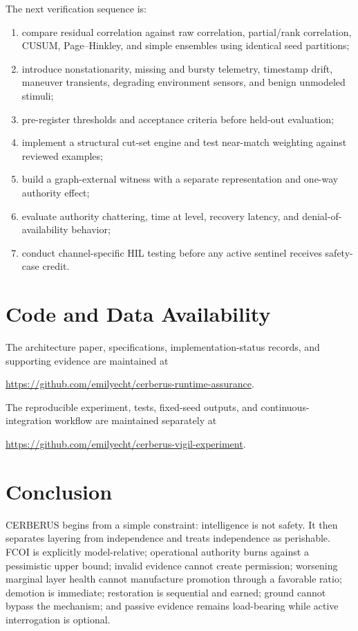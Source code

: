 The next verification sequence is:
\begin{enumerate}[leftmargin=1.5em]
  \item compare residual correlation against raw correlation, partial/rank correlation, CUSUM, Page--Hinkley, and simple ensembles using identical seed partitions;
  \item introduce nonstationarity, missing and bursty telemetry, timestamp drift, maneuver transients, degrading environment sensors, and benign unmodeled stimuli;
  \item pre-register thresholds and acceptance criteria before held-out evaluation;
  \item implement a structural cut-set engine and test near-match weighting against reviewed examples;
  \item build a graph-external witness with a separate representation and one-way authority effect;
  \item evaluate authority chattering, time at level, recovery latency, and denial-of-availability behavior;
  \item conduct channel-specific HIL testing before any active sentinel receives safety-case credit.
\end{enumerate}

\section{Code and Data Availability}
The architecture paper, specifications, implementation-status records, and supporting evidence are maintained at
\begin{center}
\url{https://github.com/emilyecht/cerberus-runtime-assurance}.
\end{center}
The reproducible experiment, tests, fixed-seed outputs, and continuous-integration workflow are maintained separately at
\begin{center}
\url{https://github.com/emilyecht/cerberus-vigil-experiment}.
\end{center}

\section{Conclusion}
CERBERUS begins from a simple constraint: intelligence is not safety. It then separates layering from independence and treats independence as perishable. FCOI is explicitly model-relative; operational authority burns against a pessimistic upper bound; invalid evidence cannot create permission; worsening marginal layer health cannot manufacture promotion through a favorable ratio; demotion is immediate; restoration is sequential and earned; ground cannot bypass the mechanism; and passive evidence remains load-bearing while active interrogation is optional.

